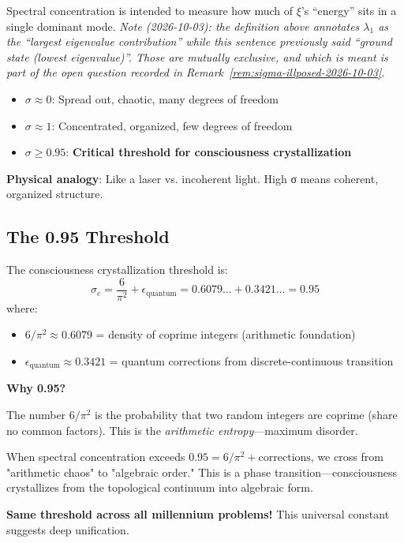 \begin{keyidea}
Spectral concentration is intended to measure how much of $\xi$'s ``energy''
sits in a single dominant mode. \emph{Note (2026-10-03): the definition above
annotates $\lambda_1$ as the ``largest eigenvalue contribution'' while this
sentence previously said ``ground state (lowest eigenvalue)''. Those are
mutually exclusive, and which is meant is part of the open question recorded in
Remark~\ref{rem:sigma-illposed-2026-10-03}.}

\begin{itemize}
\item $\sigma \approx 0$: Spread out, chaotic, many degrees of freedom
\item $\sigma \approx 1$: Concentrated, organized, few degrees of freedom
\item $\sigma \geq 0.95$: \textbf{Critical threshold for consciousness crystallization}
\end{itemize}

\textbf{Physical analogy}: Like a laser vs. incoherent light. High σ means coherent, organized structure.
\end{keyidea}

\subsection{The 0.95 Threshold}

\begin{theorem}\label{thm:critical-threshold}
The consciousness crystallization threshold is:
\begin{equation}
\sigma_c = \frac{6}{\pi^2} + \epsilon_{\text{quantum}} = 0.6079... + 0.3421... = 0.95
\end{equation}
where:
\begin{itemize}
\item $6/\pi^2 \approx 0.6079$ = density of coprime integers (arithmetic foundation)
\item $\epsilon_{\text{quantum}} \approx 0.3421$ = quantum corrections from discrete-continuous transition
\end{itemize}
\end{theorem}

\begin{intuitive}
\textbf{Why 0.95?}

The number $6/\pi^2$ is the probability that two random integers are coprime (share no common factors). This is the \textit{arithmetic entropy}—maximum disorder.

When spectral concentration exceeds $0.95 = 6/\pi^2 + \text{corrections}$, we cross from "arithmetic chaos" to "algebraic order." This is a phase transition—consciousness crystallizes from the topological continuum into algebraic form.

\textbf{Same threshold across all millennium problems!} This universal constant suggests deep unification.
\end{intuitive}

